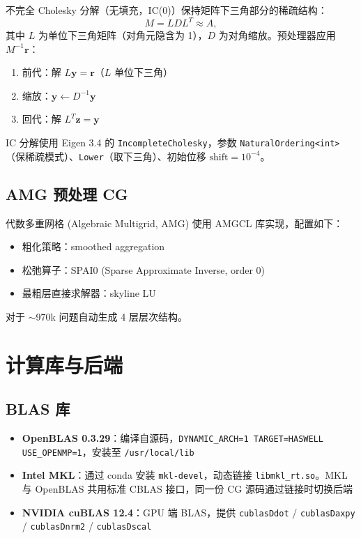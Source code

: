 \documentclass[12pt,a4paper]{ctexart}
\begin{document}
不完全 Cholesky 分解（无填充，IC(0)）保持矩阵下三角部分的稀疏结构：
\begin{equation}
M = L D L^T \approx A,
\end{equation}
其中 $L$ 为单位下三角矩阵（对角元隐含为 1），$D$ 为对角缩放。预处理器应用 $M^{-1}\mathbf{r}$：
\begin{enumerate}
\item 前代：解 $L\mathbf{y} = \mathbf{r}$（$L$ 单位下三角）
\item 缩放：$\mathbf{y} \leftarrow D^{-1}\mathbf{y}$
\item 回代：解 $L^T\mathbf{z} = \mathbf{y}$
\end{enumerate}
IC 分解使用 Eigen 3.4 的 \texttt{IncompleteCholesky}，参数 \texttt{NaturalOrdering<int>}（保稀疏模式）、\texttt{Lower}（取下三角）、初始位移 $\mathrm{shift} = 10^{-4}$。

\subsection{AMG 预处理 CG}

代数多重网格 (Algebraic Multigrid, AMG) 使用 AMGCL 库实现，配置如下：
\begin{itemize}
\item 粗化策略：smoothed aggregation
\item 松弛算子：SPAI0 (Sparse Approximate Inverse, order 0)
\item 最粗层直接求解器：skyline LU
\end{itemize}
对于 $\sim$970k 问题自动生成 4 层层次结构。

\section{计算库与后端}

\subsection{BLAS 库}

\begin{itemize}
\item \textbf{OpenBLAS 0.3.29}：编译自源码，\texttt{DYNAMIC\_ARCH=1 TARGET=HASWELL USE\_OPENMP=1}，安装至 \texttt{/usr/local/lib}
\item \textbf{Intel MKL}：通过 conda 安装 \texttt{mkl-devel}，动态链接 \texttt{libmkl\_rt.so}。MKL 与 OpenBLAS 共用标准 CBLAS 接口，同一份 CG 源码通过链接时切换后端
\item \textbf{NVIDIA cuBLAS 12.4}：GPU 端 BLAS，提供 \texttt{cublasDdot} / \texttt{cublasDaxpy} / \texttt{cublasDnrm2} / \texttt{cublasDscal}
\end{itemize}
\end{document}
